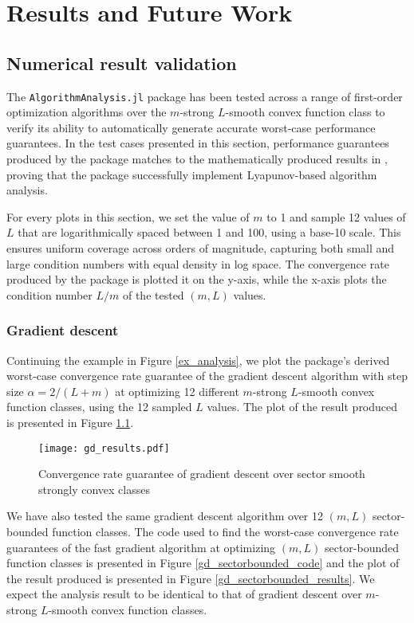 \chapter{Results and Future Work}\label{chapter:Conclusion}

\section{Numerical result validation}

The \texttt{AlgorithmAnalysis.jl} package has been tested across a range of first-order optimization algorithms over the $m$-strong $L$-smooth convex function class to verify its ability to automatically generate accurate worst-case performance guarantees. In the test cases presented in this section, performance guarantees produced by the package matches to the mathematically produced results in \cite{tutorial}, proving that the package successfully implement Lyapunov-based algorithm analysis.

For every plots in this section, we set the value of $m$ to 1 and sample 12 values of $L$ that are logarithmically spaced between 1 and 100, using a base-10 scale. This ensures uniform coverage across orders of magnitude, capturing both small and large condition numbers with equal density in log space. The convergence rate produced by the package is plotted it on the y-axis, while the x-axis plots the condition number $L/m$ of the tested $(m,L)$ values.

\subsection*{Gradient descent}

Continuing the example in Figure \ref*{ex_analysis}, we plot the package's derived worst-case convergence rate guarantee of the gradient descent algorithm with step size $\alpha = 2/(L+m)$ at optimizing 12 different $m$-strong $L$-smooth convex function classes, using the 12 sampled $L$ values. The plot of the result produced is presented in Figure \ref*{gd_results}.

\begin{figure}[h]
    \centering
    \texttt{[image: gd\_results.pdf]}
    \caption{Convergence rate guarantee of gradient descent over sector smooth strongly convex classes}
    \label{gd_results}
\end{figure}

We have also tested the same gradient descent algorithm over 12 $(m, L)$ sector-bounded function classes. The code used to find the worst-case convergence rate guarantees of the fast gradient algorithm at optimizing $(m, L)$ sector-bounded function classes is presented in Figure \ref*{gd_sectorbounded_code} and the plot of the result produced is presented in Figure \ref*{gd_sectorbounded_results}. We expect the analysis result to be identical to that of gradient descent over $m$-strong $L$-smooth convex function classes.

